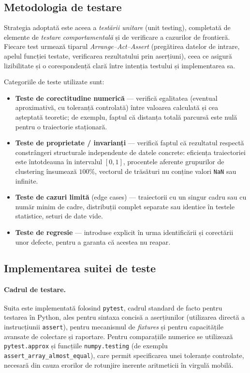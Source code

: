 \subsection{Metodologia de testare}

Strategia adoptată este aceea a \emph{testării unitare} (unit testing),
completată de elemente de \emph{testare comportamentală} și de verificare a
cazurilor de frontieră. Fiecare test urmează tiparul \emph{Arrange--Act--Assert}
(pregătirea datelor de intrare, apelul funcției testate, verificarea
rezultatului prin aserțiuni), ceea ce asigură lizibilitate și o corespondență
clară între intenția testului și implementarea sa.

Categoriile de teste utilizate sunt:

\begin{itemize}
  \item \textbf{Teste de corectitudine numerică} --- verifică egalitatea
        (eventual aproximativă, cu toleranță controlată) între valoarea
        calculată și cea așteptată teoretic; de exemplu, faptul că distanța
        totală parcursă este nulă pentru o traiectorie staționară.
  \item \textbf{Teste de proprietate / invarianți} --- verifică faptul că
        rezultatul respectă constrângeri structurale independente de datele
        concrete: eficiența traiectoriei este întotdeauna în intervalul
        $[0,1]$, procentele aferente grupurilor de clustering însumează
        $100\%$, vectorul de trăsături nu conține valori \texttt{NaN} sau
        infinite.
  \item \textbf{Teste de cazuri limită} (edge cases) --- traiectorii cu un
        singur cadru sau cu număr minim de cadre, distribuții complet
        separate sau identice în testele statistice, seturi de date vide.
  \item \textbf{Teste de regresie} --- introduse explicit în urma identificării
        și corectării unor defecte, pentru a garanta că acestea nu reapar.
\end{itemize}

\subsection{Implementarea suitei de teste}

\paragraph{Cadrul de testare.} Suita este implementată folosind
\texttt{pytest}, cadrul standard de facto pentru testarea în Python, ales pentru
sintaxa concisă a aserțiunilor (utilizarea directă a instrucțiunii
\texttt{assert}), pentru mecanismul de \emph{fixtures} și pentru capacitățile
avansate de colectare și raportare. Pentru comparațiile numerice se utilizează
\texttt{pytest.approx} și funcțiile \texttt{numpy.testing} (de exemplu
\texttt{assert\_array\_almost\_equal}), care permit specificarea unei toleranțe
controlate, necesară din cauza erorilor de rotunjire inerente aritmeticii în
virgulă mobilă.

